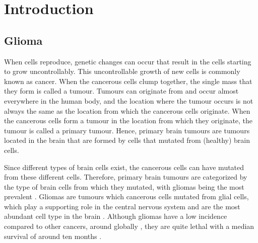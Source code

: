 
\chapter{Introduction}
\glsresetall
\section{Glioma}

When cells reproduce, genetic changes can occur that result in the cells starting to grow uncontrollably.
This uncontrollable growth of new cells is commonly known as cancer.
When the cancerous cells clump together, the single mass that they form is called a tumour.
Tumours can originate from and occur almost everywhere in the human body, and the location where the tumour occurs is not always the same as the location from which the cancerous cells originate.
When the cancerous cells form a tumour in the location from which they originate, the tumour is called a primary tumour.
Hence, primary brain tumours are tumours located in the brain that are formed by cells that mutated from (healthy) brain cells.

Since different types of brain cells exist, the cancerous cells can have mutated from these different cells.
Therefore, primary brain tumours are categorized by the type of brain cells from which they mutated, with gliomas being the most prevalent \autocite{leece2017indicence}.
Gliomas are tumours which cancerous cells mutated from glial cells, which play a supporting role in the central nervous system and are the most abundant cell type in the brain \autocite{jakel2017glial}.
Although gliomas have a low incidence compared to other cancers, around  globally \autocite{leece2017indicence}, they are quite lethal with a median survival of around ten months \autocite{hess2004gliomaincidence}.

